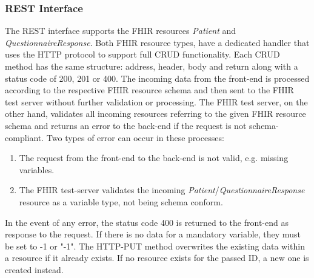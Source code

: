 \documentclass[
a4paper,
11pt
]{article}
\begin{document}
	\subsubsection*{REST Interface}
	The REST interface supports the \ac{FHIR} resources \textit{Patient} and \textit{QuestionnaireResponse}. Both \ac{FHIR} resource types, have a dedicated handler that uses the \ac{HTTP} protocol to support full \ac{CRUD} functionality. Each \ac{CRUD} method has the same structure: address, header, body and return along with a status code of 200, 201 or 400. The incoming data from the front-end is processed according to the respective \ac{FHIR} resource schema and then sent to the \ac{FHIR} test server without further validation or processing. The \ac{FHIR} test server, on the other hand, validates all incoming resources referring to the given \ac{FHIR} resource schema and returns an error to the back-end if the request is not schema-compliant. Two types of error can occur in these processes:
	\begin{enumerate}
		\item The request from the front-end to the back-end is not valid, e.g. missing variables.
		\item The \ac{FHIR} test-server validates the incoming \textit{Patient}/\textit{QuestionnaireResponse} resource as a variable type, not being schema conform.
	\end{enumerate}
	In the event of any error, the status code 400 is returned to the front-end as response to the request. If there is no data for a mandatory variable, they must be set to -1 or "-1". The \ac{HTTP}-PUT method overwrites the existing data within a resource if it already exists. If no resource exists for the passed ID, a new one is created instead.
\end{document}
